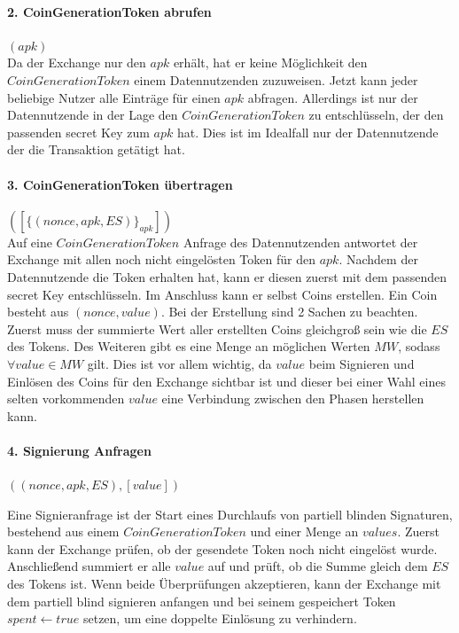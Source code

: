 \documentclass{scrreprt}
\begin{document}
\paragraph{2. CoinGenerationToken abrufen} $(apk)$\\
Da der Exchange nur den $apk$ erhält, hat er keine Möglichkeit den $CoinGenerationToken$ einem Datennutzenden zuzuweisen. Jetzt kann jeder beliebige Nutzer alle Einträge für einen $apk$ abfragen. Allerdings ist nur der Datennutzende in der Lage den $CoinGenerationToken$ zu entschlüsseln, der den passenden secret Key zum $apk$ hat. Dies ist im Idealfall nur der Datennutzende der die Transaktion getätigt hat.

\paragraph{3. CoinGenerationToken übertragen} $([\{(nonce, apk, ES)\}_{apk}])$\\
Auf eine $CoinGenerationToken$ Anfrage des Datennutzenden antwortet der Exchange mit allen noch nicht eingelösten Token für den $apk$. Nachdem der Datennutzende die Token erhalten hat, kann er diesen zuerst mit dem passenden secret Key entschlüsseln. Im Anschluss kann er selbst Coins erstellen. Ein Coin besteht aus $(nonce, value)$. Bei der Erstellung sind 2 Sachen zu beachten. Zuerst muss der summierte Wert aller erstellten Coins gleichgroß sein wie die $ES$ des Tokens. Des Weiteren gibt es eine Menge an möglichen Werten $MW$, sodass $\forall value\in MW$ gilt. Dies ist vor allem wichtig, da $value$ beim Signieren und Einlösen des Coins für den Exchange sichtbar ist und dieser bei einer Wahl eines selten vorkommenden $value$ eine Verbindung zwischen den Phasen herstellen kann.

\paragraph{4. Signierung Anfragen} $((nonce, apk, ES), [value])$

Eine Signieranfrage ist der Start eines Durchlaufs von partiell blinden Signaturen, bestehend aus einem $CoinGenerationToken$ und einer Menge an $values$. Zuerst kann der Exchange prüfen, ob der gesendete Token noch nicht eingelöst wurde. Anschließend summiert er alle $value$ auf und prüft, ob die Summe gleich dem $ES$ des Tokens ist. Wenn beide Überprüfungen akzeptieren, kann der Exchange mit dem partiell blind signieren anfangen und bei seinem gespeichert Token $spent \leftarrow true$ setzen, um eine doppelte Einlösung zu verhindern.
\end{document}
